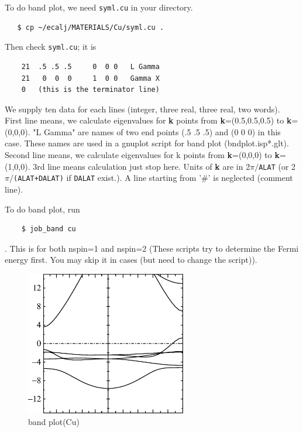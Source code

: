 \documentclass[a4paper,10pt,epsf,fleqn]{article}
\begin{document}
To do band plot, we need \verb+syml.cu+ in your directory.
\begin{verbatim}
   $ cp ~/ecalj/MATERIALS/Cu/syml.cu .
\end{verbatim}
Then check \verb+syml.cu+; it is
\begin{verbatim}
    21  .5 .5 .5     0  0 0   L Gamma
    21   0  0  0     1  0 0   Gamma X
    0   (this is the terminator line)
\end{verbatim}
We supply ten data for each lines
(integer, three real, three real, two words).
First line means, we calculate eigenvalues 
for {\bf k} points from {\bf k}=(0.5,0.5,0.5) to {\bf k}=(0,0,0).
"L Gamma" are names of two end points 
(.5 .5 .5) and (0 0 0) in this case.
These names are used in a gnuplot script for band plot
(bndplot.isp*.glt).
Second line means, we calculate eigenvalues 
for k points from {\bf k}=(0,0,0) to {\bf k}=(1,0,0).
3rd line means calculation just stop here.
Units of {\bf k} are in 2$\pi/$\verb+ALAT+ (or 2$\pi/$\verb#(ALAT+DALAT)#
if \verb+DALAT+ exist.).
A line starting from '\#' is neglected (comment line).

To do band plot, run
\begin{verbatim}
    $ job_band cu
\end{verbatim}
. This is for both nspin=1 and nspin=2
(These scripts try to determine the Fermi energy first. You may skip it
in cases (but need to change the script)).

\begin{figure}[h]
 \begin{center}
  \includegraphics[width=70mm]{img/bandcu.eps}
  \caption{band plot(Cu)}
 \end{center}
\end{figure}
\end{document}
